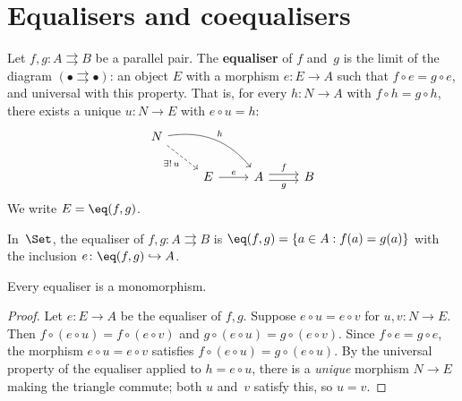 \section{Equalisers and coequalisers}\label{sec:equalisers}

\begin{definition}[Equaliser]\label{def:equaliser}
Let $f,g\colon A\rightrightarrows B$ be a parallel pair.
The \textbf{equaliser} of $f$ and~$g$ is the limit of the diagram
$(\bullet\rightrightarrows\bullet)$: an object $E$ with a morphism
$e\colon E\to A$ such that $f\circ e = g\circ e$,
and universal with this property.
That is, for every $h\colon N\to A$ with $f\circ h = g\circ h$,
there exists a unique $u\colon N\to E$ with $e\circ u = h$:
\[
\begin{tikzcd}
N \arrow[dr, dashed, "\exists!\,u"'] \arrow[drr, bend left, "h"] & & \\
& E \arrow[r, "e"] & A \arrow[r, shift left, "f"] \arrow[r, shift right, "g"'] & B
\end{tikzcd}
\]
We write $E = \eq(f,g)$.
\end{definition}

\begin{example}\label{ex:equaliser-set}
In~$\Set$, the equaliser of $f,g\colon A\rightrightarrows B$ is
$\eq(f,g) = \{a\in A : f(a) = g(a)\}$
with the inclusion $e\colon\eq(f,g)\hookrightarrow A$.
\end{example}

\begin{proposition}\label{prop:equaliser-mono}
Every equaliser is a monomorphism.
\end{proposition}

\begin{proof}
Let $e\colon E\to A$ be the equaliser of $f,g$.
Suppose $e\circ u = e\circ v$ for $u,v\colon N\to E$.
Then $f\circ(e\circ u) = f\circ(e\circ v)$ and
$g\circ(e\circ u) = g\circ(e\circ v)$.
Since $f\circ e = g\circ e$, the morphism $e\circ u = e\circ v$
satisfies $f\circ(e\circ u) = g\circ(e\circ u)$.
By the universal property of the equaliser applied to $h = e\circ u$,
there is a \emph{unique} morphism $N\to E$ making the triangle commute;
both $u$ and~$v$ satisfy this, so $u = v$.
\end{proof}

